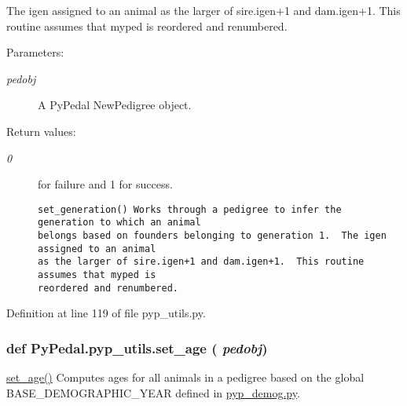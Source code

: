 The igen assigned to an animal as the larger of sire.igen+1 and dam.igen+1. This routine assumes that myped is reordered and renumbered. \begin{Desc}
\item[Parameters:]
\begin{description}
\item[{\em pedobj}]A Py\-Pedal New\-Pedigree object. \end{description}
\end{Desc}
\begin{Desc}
\item[Return values:]
\begin{description}
\item[{\em 0}]for failure and 1 for success.

\footnotesize\begin{verbatim}set_generation() Works through a pedigree to infer the generation to which an animal
belongs based on founders belonging to generation 1.  The igen assigned to an animal
as the larger of sire.igen+1 and dam.igen+1.  This routine assumes that myped is
reordered and renumbered.
\end{verbatim}
\normalsize
 \end{description}
\end{Desc}


Definition at line 119 of file pyp\_\-utils.py.\hypertarget{namespacePyPedal_1_1pyp__utils_2a22bff8204191703ab00d42382b877d}{
\subsubsection[set\_\-age]{\setlength{\rightskip}{0pt plus 5cm}def Py\-Pedal.pyp\_\-utils.set\_\-age ( {\em pedobj})}}
\label{namespacePyPedal_1_1pyp__utils_2a22bff8204191703ab00d42382b877d}


\hyperlink{namespacePyPedal_1_1pyp__utils_2a22bff8204191703ab00d42382b877d}{set\_\-age()} Computes ages for all animals in a pedigree based on the global BASE\_\-DEMOGRAPHIC\_\-YEAR defined in \hyperlink{pyp__demog_8py-source}{pyp\_\-demog.py}. 

